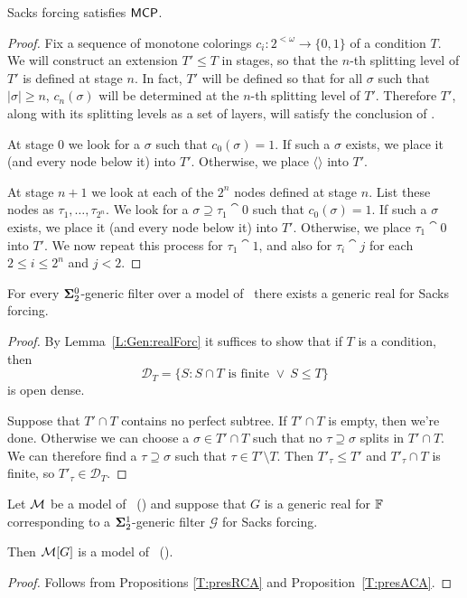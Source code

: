 \begin{prop}[\ACAo]\label{P:Sk:MCP}
Sacks forcing satisfies $\mathsf{MCP}$.
\end{prop}
\begin{proof}
Fix a sequence of monotone colorings $c_i:2^{<\omega}\rightarrow \{0,1\}$
of a condition $T$.
We will construct an extension $T'\leq T$ in stages,
so that the $n$-th splitting level of $T'$ is defined at stage $n$.
In fact, $T'$ will be defined so that for all $\sigma$ such that $|\sigma|\geq n$,
$c_n(\sigma)$ will be determined at the $n$-th splitting level of $T'$.
Therefore $T'$, along with its splitting levels as a set of layers,
will satisfy the conclusion of \MCP.

At stage $0$ we look for a $\sigma$ such that $c_0(\sigma)=1$.
If such a $\sigma$ exists, we place it (and every node below it) into $T'$.
Otherwise, we place $\langle\rangle$ into $T'$.

At stage $n+1$ we look at each of the $2^n$ nodes defined at stage $n$.
List these nodes as $\tau_1,\ldots,\tau_{2^n}$.
We look for a $\sigma\supseteq\tau_1\cat{0}$ such that $c_0(\sigma)=1$.
If such a $\sigma$ exists, we place it (and every node below it) into $T'$.
Otherwise, we place $\tau_1\cat{0}$ into $T'$.
We now repeat this process for $\tau_1\cat{1}$, and also for
$\tau_i\cat{j}$ for each $2\leq i\leq 2^n$ and $j<2$.
\end{proof}

\begin{lem}\label{L:Sk:realForc}
For every $\mathbf{\Sigma}^0_2$-generic filter over a model of \RCAo\
there exists a generic real for Sacks forcing.
\end{lem}

\begin{proof}
By Lemma~\ref{L:Gen:realForc} it
suffices to show that if $T$ is a condition, then
$$\mathcal{D}_T=\{S:S\cap T\text{ is finite }\lor\ S\leq T\}$$
is open dense.

Suppose that $T'\cap T$ contains no perfect subtree.
If $T'\cap T$ is empty, then we're done.
Otherwise we can choose a $\sigma\in T'\cap T$ such that no
$\tau\supseteq\sigma$ splits in $T'\cap T$.
We can therefore find a $\tau\supseteq\sigma$ such that
$\tau\in T'\setminus T$.
Then $T'_\tau\leq T'$ and $T'_\tau\cap T$ is finite,
so $T'_\tau\in\mathcal{D}_T$.
\end{proof}

\begin{thm}
Let $\mathcal{M}$ be a model of \RCAo\ (\ACAo)
and suppose that $G$ is a generic real for $\mathbb{F}$
corresponding to a $\mathbf{\Sigma}^1_2$-generic filter $\mathcal{G}$ for Sacks forcing.

Then $\mathcal{M}[G]$ is a model of \RCAo\ (\ACAo).
\end{thm}
\begin{proof}
Follows from Propositions \ref{T:presRCA} and Proposition~\ref{T:presACA}.
\end{proof}

